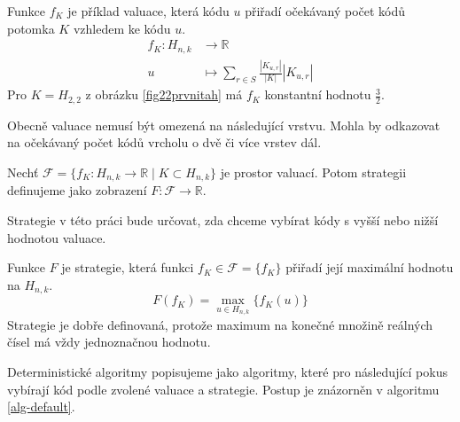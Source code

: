\begin{prikl}\label{prjednokrokfce}
    Funkce $f_K$ je příklad valuace, která kódu $u$ přiřadí očekávaný počet kódů potomka $K$ vzhledem ke kódu $u$.
    \begin{align*}
        f_K \colon H_{n,k} &\to \mathbb{R} \\
        u &\mapsto \sum_{r\in S}\frac{|K_{u,r}|}{|K|}|K_{u,r}| 
    \end{align*}
    Pro $K = H_{2,2}$ z obrázku \ref{fig22prvnitah} má $f_{K}$ konstantní hodnotu $\frac{3}{2}$.
\end{prikl}
Obecně valuace nemusí být omezená na následující vrstvu. Mohla by odkazovat na očekávaný počet kódů vrcholu o dvě či více vrstev dál. 

\begin{definice}[Strategie]
    Nechť $\mathcal{F} = \{f_K\colon H_{n,k} \to \mathbb{R} \mid K \subset H_{n,k}\}$ je prostor valuací. Potom strategii definujeme jako zobrazení $F \colon \mathcal{F} \to \mathbb{R}$. 
\end{definice}
Strategie v této práci bude určovat, zda chceme vybírat kódy s vyšší nebo nižší hodnotou valuace.

\begin{prikl}\label{prstrategie}
    Funkce $F$ je strategie, která funkci $f_K \in \mathcal{F} = \{f_K\}$ přiřadí její maximální hodnotu na $H_{n,k}$.
    \[F(f_K) =  \max_{u\in H_{n,k}}\{f_K(u)\}\]
    Strategie je dobře definovaná, protože maximum na konečné množině reálných čísel má vždy jednoznačnou hodnotu.
\end{prikl}

Deterministické algoritmy popisujeme jako algoritmy, které pro následující pokus vybírají kód podle zvolené valuace a strategie. Postup je znázorněn v algoritmu \ref{alg-default}.







